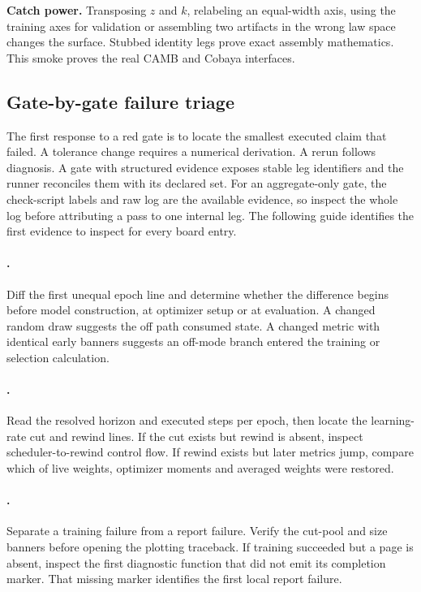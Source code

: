 \textbf{Catch power.}  Transposing \(z\) and \(k\), relabeling an equal-width
axis, using the training axes for validation or assembling two artifacts in
the wrong law space changes the surface.  Stubbed identity legs prove exact
assembly mathematics.  This smoke proves the real CAMB and Cobaya interfaces.

\subsection{Gate-by-gate failure triage}

The first response to a red gate is to locate the smallest executed claim that
failed.  A tolerance change requires a numerical derivation.  A rerun follows
diagnosis.  A gate with structured evidence exposes stable leg identifiers and
the runner reconciles them with its declared set.  For an aggregate-only gate,
the check-script labels and raw log are the available evidence, so inspect the
whole log before attributing a pass to one internal leg.  The following guide
identifies the first evidence to inspect for every board entry.

\paragraph{.}
Diff the first unequal epoch line and determine whether the difference begins
before model construction, at optimizer setup or at evaluation.  A changed
random draw suggests the off path consumed state.  A changed metric with
identical early banners suggests an off-mode branch entered the training or
selection calculation.

\paragraph{.}
Read the resolved horizon and executed steps per epoch, then locate the
learning-rate cut and rewind lines.  If the cut exists but rewind is absent,
inspect scheduler-to-rewind control flow.  If rewind exists but later metrics
jump, compare which of live weights, optimizer moments and averaged weights
were restored.

\paragraph{.}
Separate a training failure from a report failure.  Verify the cut-pool and
size banners before opening the plotting traceback.  If training succeeded
but a page is absent, inspect the first diagnostic function that did not emit
its completion marker.  That missing marker identifies the first local report
failure.

